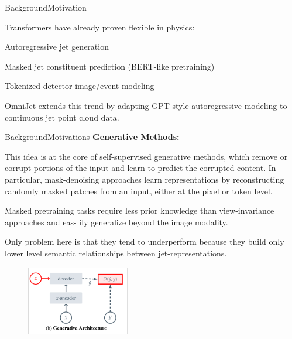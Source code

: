 \documentclass[10pt]{beamer}
\let\olditemize\itemize
\let\endolditemize\enditemize
\renewenvironment{itemize}{
  \olditemize[<+->] %
}{\endolditemize}
\begin{document}
\begin{frame}{Background}{Motivation}

    Transformers have already proven flexible in physics:

    \begin{itemize}
      \item Autoregressive jet generation
      \item Masked jet constituent prediction (BERT-like pretraining)
      \item Tokenized detector image/event modeling
  \end{itemize}

  OmniJet extends this trend by adapting GPT-style autoregressive modeling to continuous jet point cloud data.

\end{frame}

\begin{frame}{Background}{Motivations}
  \textbf{Generative Methods:}
  \begin{footnotesize}
This idea is at the core of self-supervised generative methods, which remove
or corrupt portions of the input and learn to predict the corrupted content.
In particular, mask-denoising approaches learn representations by reconstructing
randomly masked patches from an input, either at the pixel or token level.

Masked pretraining tasks require less
prior knowledge than view-invariance approaches and eas-
ily generalize beyond the image modality.

Only problem here is that they tend to underperform because
they build only lower level semantic relationships between jet-representations.

\end{footnotesize}
\begin{figure}
  \includegraphics[width=0.4\textwidth]{gen.png}
\end{figure}

\end{frame}
\end{document}
